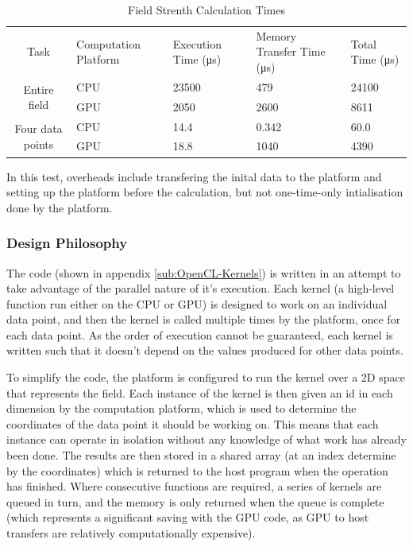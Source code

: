 \documentclass[10pt]{article} \usepackage[a4paper]{geometry}
\begin{document}
\begin{singlespace}
\begin{table}
\centering%
\begin{tabular}{|c|m{2cm}|p{2cm}|p{3cm}|m{2cm}|}
\hline
\multirow{2}{*}{Task} & \multirow{2}{3cm}{Computation Platform} &
\multirow{2}{2cm}{Execution Time (\si{\micro\second})} &
\multirow{2}{3cm}{Memory Transfer Time (\si{\micro\second})} & \multirow{2}{2cm}{Total Time (\si{\micro\second})} \\
 &  &  &  & \\
\hline
\multirow{2}{*}{Entire field} & \ac{CPU} & \num{23500} & \num{479} & \num{24100}
\\
\cline{2-5}
 & \ac{GPU} & \num{2050} & \num{2600} & \num{8611} \\
\hline
\multirow{2}{*}{Four data points} & \ac{CPU} & \num{14.4} & \num{0.342} &
\num{60.0}
\\
\cline{2-5}
 & \ac{GPU} & \num{18.8} & \num{1040} & \num{4390} \\
\hline
\end{tabular}

In this test, overheads include transfering the inital data to the platform and
setting up the platform before the calculation, but not one-time-only
intialisation done by the platform.

\caption{Field Strenth Calculation Times\label{tab:Field-Strenth-Calculation}}
\end{table}

\end{singlespace}

\subsubsection{Design Philosophy}

The code (shown in appendix \ref{sub:OpenCL-Kernels}) is written in an attempt
to take advantage of the parallel nature of it's execution. Each kernel (a
high-level function run either on the \ac{CPU} or \ac{GPU}) is designed to work
on an individual data point, and then the kernel is called multiple times by the
platform, once for each data point. As the order of execution cannot be
guaranteed, each kernel is written such that it doesn't depend on the values
produced for other data points.

To simplify the code, the platform is configured to run the kernel over a 2D
space that represents the field. Each instance of the kernel is then given an id
in each dimension by the computation platform, which is used to determine the
coordinates of the data point it should be working on. This means that each
instance can operate in isolation without any knowledge of what work has already
been done. The results are then stored in a shared array (at an index determine
by the coordinates) which is returned to the host program when the operation has
finished. Where consecutive functions are required, a series of kernels are
queued in turn, and the memory is only returned when the queue is complete
(which represents a significant saving with the \ac{GPU} code, as \ac{GPU} to
host transfers are relatively computationally expensive).
\end{document}

